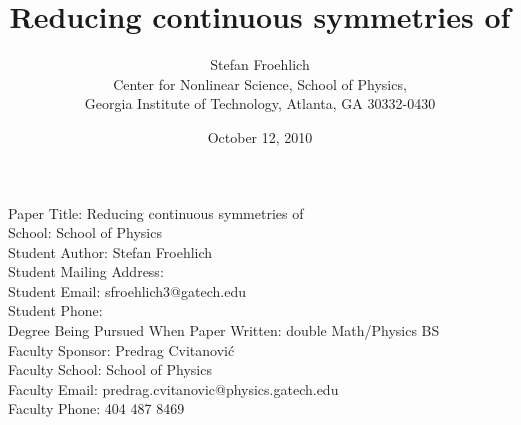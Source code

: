 
\noindent
Paper Title: Reducing continuous symmetries of \cLe
\\School: School of Physics
\\Student Author: Stefan Froehlich
\\Student Mailing Address:
\\Student Email: sfroehlich3@gatech.edu
\\Student Phone:
\\Degree Being Pursued When Paper Written: double Math/Physics BS
\\Faculty Sponsor: Predrag Cvitanovi\'{c}
\\Faculty School: School of Physics
\\Faculty Email: predrag.cvitanovic@physics.gatech.edu
\\Faculty Phone: 404 487 8469
\newpage

        \title{Reducing continuous symmetries of \cLe}
        \author{
Stefan Froehlich
\\
Center for Nonlinear Science, School of Physics,
\\
Georgia Institute of Technology,
Atlanta, GA 30332-0430
        }
        \date{October 12, 2010} \Private{\date{\today}}

    \ifarticle
    \else
    \fi %

